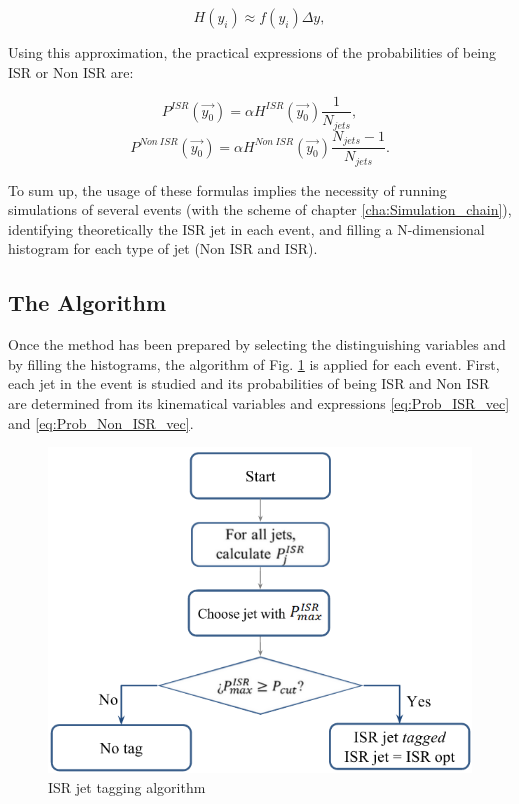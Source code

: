 \documentclass[12pt, oneside]{book}              %
\begin{document}
\begin{equation} \label{eq:Approx_histo}
H(y_i) \approx f(y_i)\Delta y,
\end{equation}

Using this approximation, the practical expressions of the probabilities of being ISR or Non ISR are:

\begin{equation} \label{eq:Prob_ISR_hist}
P^{ISR}(\vec{y_0}) = \alpha H^{ISR}(\vec{y_0}) \frac{1}{N_{jets}},
\end{equation}
\begin{equation} \label{eq:Prob_Non_ISR_hist}
P^{Non\ ISR}(\vec{y_0}) = \alpha H^{Non\ ISR}(\vec{y_0}) \frac{N_{jets}-1}{N_{jets}}.
\end{equation}

To sum up, the usage of these formulas implies the necessity of running 
simulations of several events (with the scheme of chapter \ref{cha:Simulation_chain}),
identifying theoretically the ISR jet in each event, and filling a N-dimensional histogram
for each type of jet (Non ISR and ISR).

\subsection{The Algorithm} \label{sub:Algorithm}

Once the method has been prepared by selecting the distinguishing variables and 
by filling the histograms, the algorithm of Fig. \ref{fig:Tagging_algorithm} 
is applied for each event. First, each jet in the event is studied and its
probabilities of being ISR and Non ISR are determined from
its kinematical variables and expressions \ref{eq:Prob_ISR_vec} and \ref{eq:Prob_Non_ISR_vec}.

\begin{figure}[h]
	\centering
	\includegraphics[width=0.8\linewidth]{./Imags_Doc/Tagging_algorithm}
	\caption[ISR jet tagging algorithm]{ISR jet tagging algorithm}
	\label{fig:Tagging_algorithm}
\end{figure}
\end{document}
